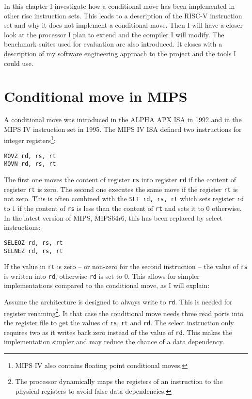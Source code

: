 \documentclass[12pt,twoside,notitlepage]{report}
\begin{document}
In this chapter I investigate how a conditional move has been implemented in other \gls{risc} instruction sets. This leads to a description of the RISC-V instruction set and why it does not implement a conditional move. Then I will have a closer look at the processor I plan to extend and the compiler I will modify. The benchmark suites used for evaluation are also introduced. It closes with a description of my software engineering approach to the project and the tools I could use.

\section{Conditional move in MIPS}

A conditional move was introduced in the ALPHA APX \gls{ISA} in 1992\cite{sites1993alpha} and in the MIPS IV instruction set in 1995\cite{MIPSIV}. The MIPS IV \gls{ISA} defined two instructions for integer registers\footnote{MIPS IV also contains floating point conditional moves.}:
\begin{verbatim}
MOVZ rd, rs, rt
MOVN rd, rs, rt
\end{verbatim}
The first one moves the content of register \texttt{rs} into register \texttt{rd} if the content of register \texttt{rt} is zero. The second one executes the same move if the register \texttt{rt} is not zero.
 This is often combined with the \texttt{SLT rd, rs, rt} which sets register \texttt{rd} to $1$ if the content of \texttt{rs} is less than the content of \texttt{rt} and sets it to $0$ otherwise.
In the latest version of MIPS, MIPS64r6, this has been replaced by select instructions:
\begin{verbatim}
SELEQZ rd, rs, rt
SELNEZ rd, rs, rt
\end{verbatim}
If the value in \texttt{rt} is zero -- or non-zero for the second instruction -- the value of \texttt{rs} is written into \texttt{rd}, otherwise \texttt{rd} is set to $0$. This allows for simpler implementations compared to the conditional move, as I will explain:

Assume the architecture is designed to always write to \texttt{rd}. This is needed for register renaming\footnote{The processor dynamically maps the registers of an instruction to the physical registers to avoid false data dependencies.}. It that case the conditional move needs three read ports into the register file to get the values of \texttt{rs}, \texttt{rt} and \texttt{rd}. The select instruction only requires two as it writes back zero instead of the value of \texttt{rd}. This makes the implementation simpler and may reduce the chance of a data dependency.
\end{document}
